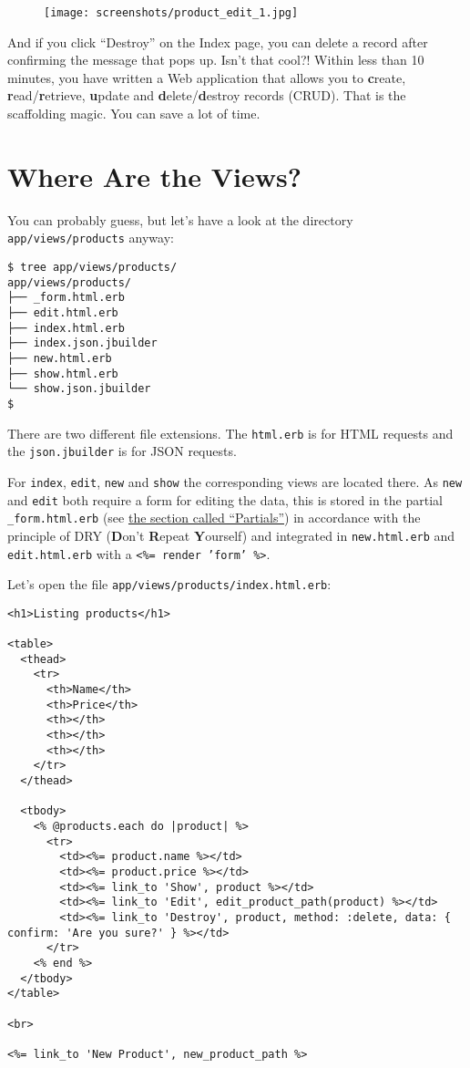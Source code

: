 \documentclass[a4paper]{book}
\newcounter{tab}[chapter]
\newcommand{\chap}[1]{\newpage\thispagestyle{empty}\chapter{#1}\label{chap:\thechapter}}
\begin{document}
\begin{figure}[htbp]
\centering
\texttt{[image: screenshots/product\_edit\_1.jpg]}
\end{figure}

And if you click “Destroy” on the Index page, you can delete a record after confirming the message that pops up. Isn't that cool?! Within less than 10 minutes, you have written a Web application that allows you to \textbf{c}reate, \textbf{r}ead/\textbf{r}etrieve, \textbf{u}pdate and \textbf{d}elete/\textbf{d}estroy records (CRUD). That is the scaffolding magic. You can save a lot of time.

\chap{Where Are the Views?}\label{where-are-the-views}

You can probably guess, but let's have a look at the directory \texttt{app/views/products} anyway:

\begin{shaded}\begin{verbatim}
$ tree app/views/products/
app/views/products/
├── _form.html.erb
├── edit.html.erb
├── index.html.erb
├── index.json.jbuilder
├── new.html.erb
├── show.html.erb
└── show.json.jbuilder
$
\end{verbatim}\end{shaded}

There are two different file extensions. The \texttt{html.erb} is for HTML requests and the \texttt{json.jbuilder} is for JSON requests.

For \texttt{index}, \texttt{edit}, \texttt{new} and \texttt{show} the corresponding views are located there. As \texttt{new} and \texttt{edit} both require a form for editing the data, this is stored in the partial \texttt{\_form.html.erb} (see \hyperref[partials]{the section called “Partials”}) in accordance with the principle of DRY (\textbf{D}on't \textbf{R}epeat \textbf{Y}ourself) and integrated in \texttt{new.html.erb} and \texttt{edit.html.erb} with a \texttt{\textless{}\%= render 'form'         \%\textgreater{}}.

Let's open the file \texttt{app/views/products/index.html.erb}:

\begin{shaded}\begin{verbatim}
<h1>Listing products</h1>

<table>
  <thead>
    <tr>
      <th>Name</th>
      <th>Price</th>
      <th></th>
      <th></th>
      <th></th>
    </tr>
  </thead>

  <tbody>
    <% @products.each do |product| %>
      <tr>
        <td><%= product.name %></td>
        <td><%= product.price %></td>
        <td><%= link_to 'Show', product %></td>
        <td><%= link_to 'Edit', edit_product_path(product) %></td>
        <td><%= link_to 'Destroy', product, method: :delete, data: { confirm: 'Are you sure?' } %></td>
      </tr>
    <% end %>
  </tbody>
</table>

<br>

<%= link_to 'New Product', new_product_path %>
\end{verbatim}\end{shaded}
\end{document}
